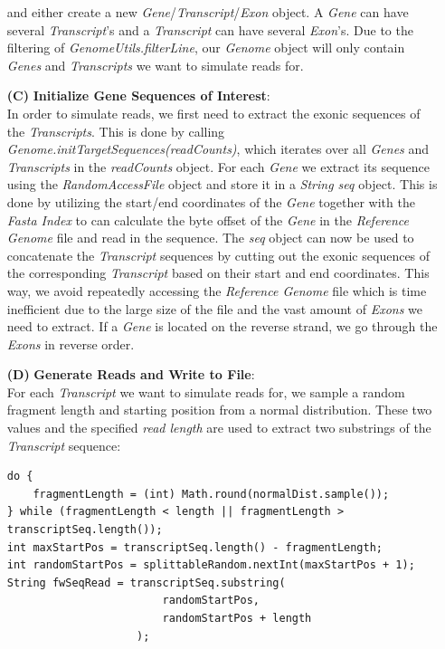 \documentclass[12pt]{article}
\begin{document}
\begin{enumerate}
		and either create a new \textit{Gene}/\textit{Transcript}/\textit{Exon} object. A \textit{Gene}
		can have several \textit{Transcript}'s and a \textit{Transcript} can have several \textit{Exon}'s.
		Due to the filtering of \textit{GenomeUtils.filterLine}, our \textit{Genome} object will only contain \textit{Genes} and
		\textit{Transcripts} we want to simulate reads for.
	\item[\textbf{(C)}] \textbf{Initialize Gene Sequences of Interest}:\\
		In order to simulate reads, we first need to extract the exonic sequences of the \textit{Transcripts}.
		This is done by calling \textit{Genome.initTargetSequences(readCounts)}, which iterates over all \textit{Genes} and
		\textit{Transcripts} in the \textit{readCounts} object. For each \textit{Gene} we extract its sequence using
		the \textit{RandomAccessFile} object and store it in a \textit{String seq} object. This is done by
		utilizing the start/end coordinates of the \textit{Gene} together with the \textit{Fasta Index}
		to can calculate the byte offset of the \textit{Gene} in the \textit{Reference Genome}
		file and read in the sequence.
		The \textit{seq} object can now be used to concatenate the \textit{Transcript} sequences by
		cutting out the exonic sequences of the corresponding \textit{Transcript} based on their
		start and end coordinates.
		This way, we avoid repeatedly accessing the \textit{Reference Genome} file which
		is time inefficient due to the large size of the file and the vast amount of \textit{Exons} we need to extract.
		If a \textit{Gene} is located on the reverse strand, we go through the \textit{Exons} in reverse order.
	\item[\textbf{(D)}] \textbf{Generate Reads and Write to File}:\\
		For each \textit{Transcript} we want to simulate reads for, we sample a random fragment length and starting position from a normal distribution.
		These two values and the specified \textit{read length} are used to extract two substrings of the \textit{Transcript} sequence:
		\begin{verbatim}
do {
    fragmentLength = (int) Math.round(normalDist.sample());
} while (fragmentLength < length || fragmentLength > transcriptSeq.length());
int maxStartPos = transcriptSeq.length() - fragmentLength;
int randomStartPos = splittableRandom.nextInt(maxStartPos + 1);
String fwSeqRead = transcriptSeq.substring(
                        randomStartPos, 
                        randomStartPos + length
                    );

\end{verbatim}
\end{enumerate}
\end{document}
